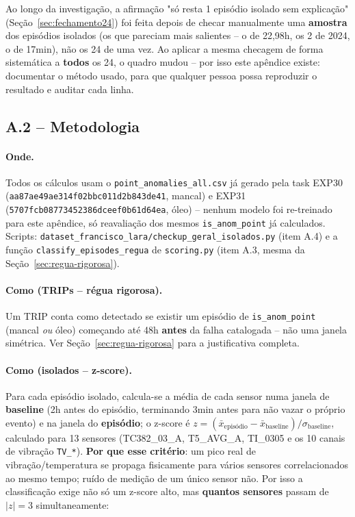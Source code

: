 \documentclass[11pt,a4paper]{article}
\begin{document}
Ao longo da investigação, a afirmação "só resta 1 episódio isolado sem
explicação" (Seção~\ref{sec:fechamento24}) foi feita depois de checar
manualmente uma \textbf{amostra} dos episódios isolados (os que
pareciam mais salientes -- o de 22,98h, os 2 de 2024, o de 17min), não
os 24 de uma vez. Ao aplicar a mesma checagem de forma sistemática a
\textbf{todos} os 24, o quadro mudou -- por isso este apêndice existe:
documentar o método usado, para que qualquer pessoa possa reproduzir o
resultado e auditar cada linha.

\subsection{A.2 -- Metodologia}

\paragraph{Onde.} Todos os cálculos usam o
\texttt{point\_anomalies\_all.csv} já gerado pela task EXP30
(\texttt{aa87ae49ae314f02bbc011d2b843de41}, mancal) e EXP31
(\texttt{5707fcb08773452386dceef0b61d64ea}, óleo) -- nenhum modelo foi
re-treinado para este apêndice, só reavaliação dos mesmos
\texttt{is\_anom\_point} já calculados. Scripts:
\texttt{dataset\_francisco\_lara/checkup\_geral\_isolados.py} (item
A.4) e a função \texttt{classify\_episodes\_regua} de
\texttt{scoring.py} (item A.3, mesma da Seção~\ref{sec:regua-rigorosa}).

\paragraph{Como (TRIPs -- régua rigorosa).} Um TRIP conta como
detectado se existir um episódio de \texttt{is\_anom\_point} (mancal
\emph{ou} óleo) começando até 48h \textbf{antes} da falha catalogada
-- não uma janela simétrica. Ver Seção~\ref{sec:regua-rigorosa} para a
justificativa completa.

\paragraph{Como (isolados -- z-score).} Para cada episódio isolado,
calcula-se a média de cada sensor numa janela de \textbf{baseline}
(2h antes do episódio, terminando 3min antes para não vazar o próprio
evento) e na janela do \textbf{episódio}; o z-score é
$z = (\bar{x}_{\text{episódio}} - \bar{x}_{\text{baseline}}) /
\sigma_{\text{baseline}}$, calculado para 13 sensores (TC382\_03\_A,
T5\_AVG\_A, TI\_0305 e os 10 canais de vibração \texttt{TV\_*}).
\textbf{Por que esse critério}: um pico real de vibração/temperatura
se propaga fisicamente para vários sensores correlacionados ao mesmo
tempo; ruído de medição de um único sensor não. Por isso a
classificação exige não só um z-score alto, mas \textbf{quantos
sensores} passam de $|z|=3$ simultaneamente:
\end{document}

